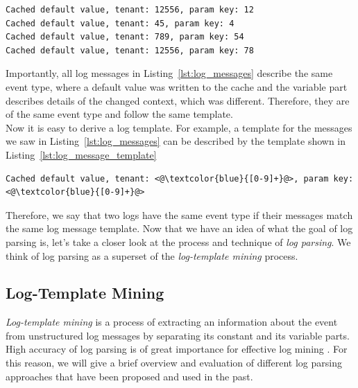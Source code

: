 \begin{lstlisting}[label={lst:log_messages}, caption={Possible outputs of the code in Listing~\ref{lst:logging_code}}, captionpos=b]
Cached default value, tenant: 12556, param key: 12
Cached default value, tenant: 45, param key: 4
Cached default value, tenant: 789, param key: 54
Cached default value, tenant: 12556, param key: 78
\end{lstlisting}

Importantly, all log messages in Listing~\ref{lst:log_messages} describe the same event type, where a default value was written to the cache and the variable part describes details of the changed context, which was different. Therefore, they are of the same event type and follow the same template. \\

Now it is easy to derive a log template. For example, a template for the messages we saw in Listing~\ref{lst:log_messages} can be described by the template shown in Listing~\ref{lst:log_message_template}\\

\begin{lstlisting}[label={lst:log_message_template}, caption={Template for log messages in Listing~\ref{lst:log_messages}, regular expressions are shown in blue.}, captionpos=b]
Cached default value, tenant: <@\textcolor{blue}{[0-9]+}@>, param key: <@\textcolor{blue}{[0-9]+}@> 
\end{lstlisting}

Therefore, we say that two logs have the same event type if their messages match the same log message template. Now that we have an idea of what the goal of log parsing is, let's take a closer look at the process and technique of \textit{log parsing}. We think of log parsing as a superset of the \textit{log-template mining} process.\\

\subsection{Log-Template Mining}\label{log_template_mining}

\textit{Log-template mining} is a process of extracting an information about the event from unstructured log messages by separating its constant and its variable parts. High accuracy of log parsing is of great importance for effective log mining \cite{logParsingEvaluation2016}. For this reason, we will give a brief overview and evaluation of different log parsing approaches that have been proposed and used in the past. \\
    
